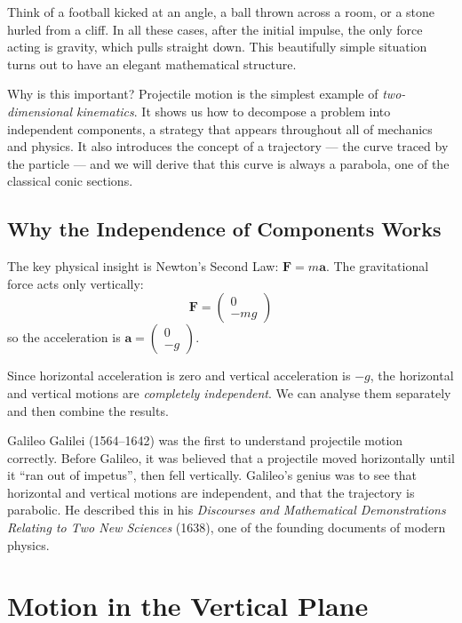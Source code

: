 \documentclass[12pt, a4paper]{book}
\newcommand{\Fvec}{\mathbf{F}}
\newcommand{\avec}{\mathbf{a}}
\begin{document}
\begin{intuitionbox}
Think of a football kicked at an angle, a ball thrown across a room, or a stone hurled from a cliff. In all these cases, after the initial impulse, the only force acting is gravity, which pulls straight down. This beautifully simple situation turns out to have an elegant mathematical structure.
\end{intuitionbox}

Why is this important? Projectile motion is the simplest example of \emph{two-dimensional kinematics}. It shows us how to decompose a problem into independent components, a strategy that appears throughout all of mechanics and physics. It also introduces the concept of a trajectory --- the curve traced by the particle --- and we will derive that this curve is always a parabola, one of the classical conic sections.

\subsection{Why the Independence of Components Works}

The key physical insight is Newton's Second Law: $\Fvec = m\avec$. The gravitational force acts only vertically:
\[
  \Fvec = \begin{pmatrix}0 \\ -mg\end{pmatrix}
\]
so the acceleration is $\avec = \begin{pmatrix}0 \\ -g\end{pmatrix}$. 

Since horizontal acceleration is zero and vertical acceleration is $-g$, the horizontal and vertical motions are \emph{completely independent}. We can analyse them separately and then combine the results.

\begin{historicalbox}
Galileo Galilei (1564--1642) was the first to understand projectile motion correctly. Before Galileo, it was believed that a projectile moved horizontally until it ``ran out of impetus'', then fell vertically. Galileo's genius was to see that horizontal and vertical motions are independent, and that the trajectory is parabolic. He described this in his \textit{Discourses and Mathematical Demonstrations Relating to Two New Sciences} (1638), one of the founding documents of modern physics.
\end{historicalbox}

\section{Motion in the Vertical Plane}
\end{document}
